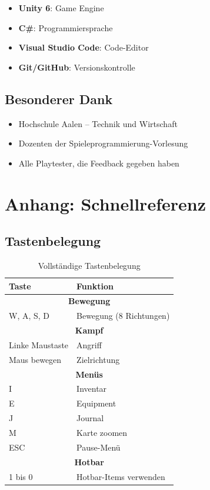 \documentclass[
  a4paper,
  11pt,
  ngerman,
  parskip=half,
  bibliography=totoc,
  listof=totoc
]{scrreprt}
\begin{document}
\begin{itemize}
    \item \textbf{Unity 6}: Game Engine
    \item \textbf{C\#}: Programmiersprache
    \item \textbf{Visual Studio Code}: Code-Editor
    \item \textbf{Git/GitHub}: Versionskontrolle
\end{itemize}

\section{Besonderer Dank}

\begin{itemize}
    \item Hochschule Aalen -- Technik und Wirtschaft
    \item Dozenten der Spieleprogrammierung-Vorlesung
    \item Alle Playtester, die Feedback gegeben haben
\end{itemize}


\chapter*{Anhang: Schnellreferenz}

\section*{Tastenbelegung}

\begin{table}[h]
\centering
\begin{tabular}{|l|l|}
\hline
\textbf{Taste} & \textbf{Funktion} \\
\hline
\multicolumn{2}{|c|}{\textbf{Bewegung}} \\
\hline
W, A, S, D & Bewegung (8 Richtungen) \\
\hline
\multicolumn{2}{|c|}{\textbf{Kampf}} \\
\hline
Linke Maustaste & Angriff \\
Maus bewegen & Zielrichtung \\
\hline
\multicolumn{2}{|c|}{\textbf{Menüs}} \\
\hline
I & Inventar \\
E & Equipment \\
J & Journal \\
M & Karte zoomen \\
ESC & Pause-Menü \\
\hline
\multicolumn{2}{|c|}{\textbf{Hotbar}} \\
\hline
1 bis 0 & Hotbar-Items verwenden \\
\hline
\end{tabular}
\caption{Vollständige Tastenbelegung}
\end{table}
\end{document}
